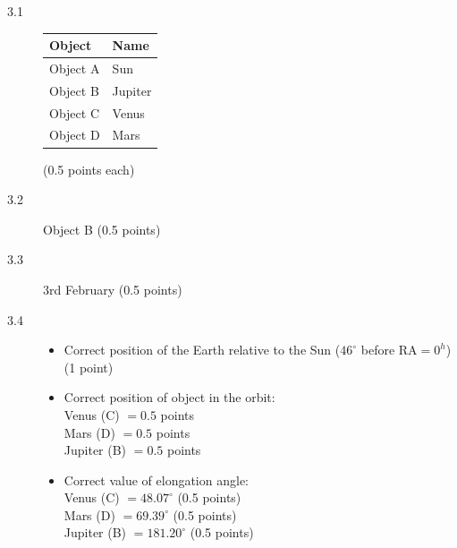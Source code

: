 \begin{description}
\item[3.1]
  \begin{center}
    \begin{tabular}{ll}
      Object   & Name    \\
      \hline
      Object A & Sun     \\
      Object B & Jupiter \\
      Object C & Venus   \\
      Object D & Mars    \\
    \end{tabular}
  \end{center}
  \hfill(0.5 points each)

\item[3.2] Object B \hfill(0.5 points)

\item[3.3] 3rd February \hfill(0.5 points)

\item[3.4]

  \begin{itemize}
  \item Correct position of the Earth relative to the Sun
    ($46^\circ$ before RA${}=0^h$) \hfill(1 point)
  \item Correct position of object in the orbit:\\
    Venus (C) ${}=0.5$ points\\
    Mars (D) ${}=0.5$ points\\
    Jupiter (B) ${}=0.5$ points
  \item Correct value of elongation angle:\\
    Venus (C) ${}=48.07^\circ$ \hfill(0.5 points)\\
    Mars (D) ${}=69.39^\circ$ \hfill(0.5 points)\\
    Jupiter (B) ${}=181.20^\circ$ %
    \hfill(0.5 points)
  \end{itemize}
\end{description}
